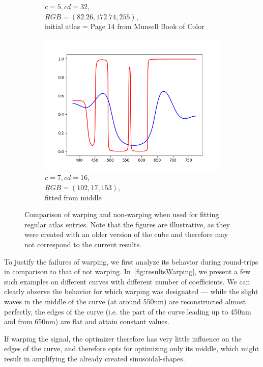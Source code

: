 \begin{figure}[t]
\begin{subfigure}[t]{0.31\textwidth}
		\caption{$c=5, cd=32$,\\$RGB=(82.26, 172.74, 255)$,\\initial atlas = Page 14 from Munsell Book of Color}
		\label{fig:warping_regularPoints_m5_cd32}
	\end{subfigure}
	\begin{subfigure}[t]{0.31\textwidth}
		\includegraphics[width=\linewidth]{img/resultsTechniqueOpt_m7_cd16.png}
		\caption{$c=7, cd=16$,\\$RGB=(102, 17, 153)$,\\ fitted from middle}
		\label{fig:warping_regularPoints_m7_cd16}
	\end{subfigure} 
	\caption{Comparison of warping and non-warping when used for fitting regular atlas entries. Note that the figures are illustrative, as they were created with an older version of the cube and therefore may not correspond to the current results.}
	\label{fig:warping_regularPoints}
\end{figure}

To justify the failures of warping, we first analyze its behavior during round-trips in comparison to that of not warping. In~\cref{fig:resultsWarping}, we present a few such examples on different curves with different number of coefficients. We can clearly observe the behavior for which warping was designated --- while the slight waves in the middle of the curve (at around 550nm) are reconstructed almost perfectly, the edges of the curve (i.e. the part of the curve leading up to 450nm and from 650nm) are flat and attain constant values.

If warping the signal, the optimizer therefore has very little influence on the edges of the curve, and therefore opts for optimizing only its middle, which might result in amplifying the already created sinusoidal-shapes.

